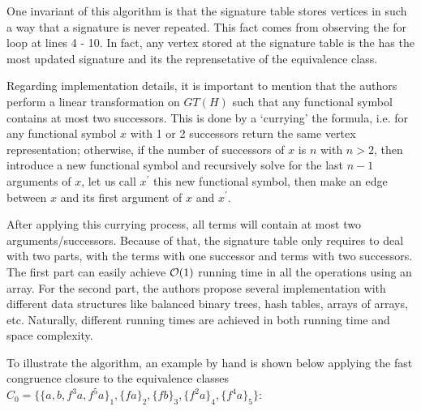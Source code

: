 One invariant of this algorithm is that the signature table
stores vertices in such a way that a signature is never repeated.
This fact comes from observing the for loop at lines 4 - 10. In fact,
any vertex stored at the signature table is the has the most updated
signature and its the reprensetative of the equivalence class.

Regarding implementation details, it is important to mention that the authors
perform a linear transformation on $GT(H)$ such that any functional symbol
contains at most two successors. This is done by a `currying' the formula,
i.e. for any functional symbol $x$ with 1 or 2 successors return the same
vertex representation; otherwise, if the number of successors of $x$ is $n$
with $n > 2$, then introduce a new functional symbol and recursively solve
for the last $n - 1$ arguments of $x$, let us call $x^{'}$ this new functional
symbol, then make an edge between $x$ and its first argument of $x$ and $x^{'}$.

After applying this currying process, all terms will contain at most two
arguments/successors. Because of that, the signature table only requires to
deal with two parts, with the terms with one successor and terms with two
successors. The first part can easily achieve $\mathcal{O}(1)$ running time in
all the operations using an array. For the second part, the authors propose
several implementation with different data structures like balanced binary trees,
hash tables, arrays of arrays, etc. Naturally, different running times are
achieved in both running time and space complexity.

To illustrate the algorithm, an example by hand is shown below applying the fast
congruence closure to the equivalence classes $C_0 = \{ \{a, b, f^3 a, f^5 a\}_1 ,\{f a\}_2 ,\{f b\}_3 ,\{f^2 a\}_4 ,\{f^4 a\}_5\}$:

